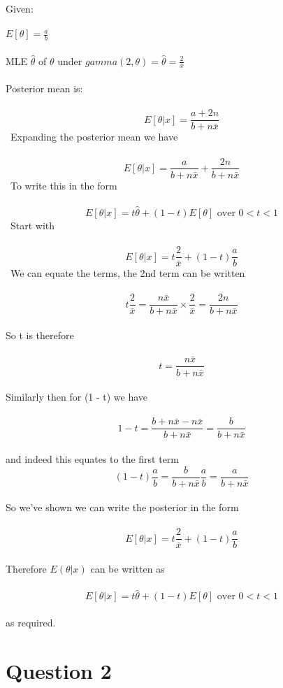 \documentclass[11pt]{article}   	%
\begin{document}
Given: \\
\\
$ E[ \theta ] = \frac{a}{b} $ \\
\\
MLE $ \hat{\theta} $ of $ \theta $ under $ gamma(2, \theta) = \hat{\theta} = \frac{2}{ \bar{x} } $ \\
\\
Posterior mean is: \\
\
\[ E[ \theta | x ] = \frac { a + 2n }{ b + n \bar{x} } \]
\
Expanding the posterior mean we have \\
\
\[ E[ \theta | x ] = \frac { a }{ b + n \bar{x} } + \frac { 2n }{ b + n \bar{x} } \]
\
To write this in the form \\
\
\[ E[ \theta | x ] = t \hat{\theta} + (1 - t) E[ \theta ] \text{ over } 0 < t < 1 \]
\
Start with \\
\
\[ E[ \theta | x ] = t \frac{2}{\bar{x}} + (1 - t) \frac{a}{b} \]
\
We can equate the terms, the 2nd term can be written \\
\
\[ t \frac{2}{\bar{x}} = \frac{ n \bar{x} }{ b + n \bar{x} } \times \frac{2}{\bar{x}} = \frac { 2 n }{ b + n \bar{x} } \]
\\
So t is therefore \\
\
\[ t = \frac{ n \bar{x} }{ b + n \bar{x} } \]
\\
Similarly then for (1 - t) we have \\
\\
\[ 1 - t = \frac{ b + n \bar{x} - n \bar{x} }{ b + n \bar{x} } = \frac{b}{b + n \bar{x} } \]
\\
and indeed this equates to the first term
\\
\[ (1 - t) \frac{a}{b} = \frac{ b }{ b + n \bar{x} } \frac{a}{b} = \frac{a}{ b + n \bar{x} } \]
\\
So we've shown we can write the posterior in the form \\
\
\[ E[ \theta | x ] = t \frac{2}{\bar{x}} + (1 - t) \frac{a}{b} \]
\\
Therefore $E(\theta|x) $ can be written as \\
\
\[ E[ \theta | x ] = t \hat{\theta} + (1 - t) E[ \theta ] \text{ over } 0 < t < 1 \]
\\
as required.

\break 


\section*{Question 2}
\end{document}
